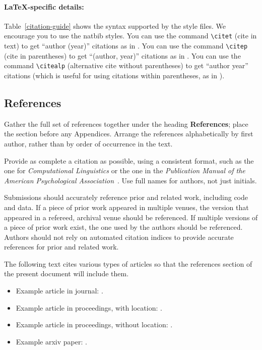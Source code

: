 \documentclass[11pt,a4paper]{article}
\begin{document}
\paragraph{\LaTeX-specific details:}
Table~\ref{citation-guide} shows the syntax supported by the style files.
We encourage you to use the natbib styles.
You can use the command {\small\verb|\citet|} (cite in text) to get ``author (year)'' citations as in \citet{Gusfield:97}.
You can use the command {\small\verb|\citep|} (cite in parentheses) to get ``(author, year)'' citations as in \citep{Gusfield:97}.
You can use the command {\small\verb|\citealp|} (alternative cite without  parentheses) to get ``author year'' citations (which is useful for  using citations within parentheses, as in \citealp{Gusfield:97}).


\subsection{References}
Gather the full set of references together under the heading \textbf{References}; place the section before any Appendices. 
Arrange the references alphabetically by first author, rather than by order of occurrence in the text.

Provide as complete a citation as possible, using a consistent format, such as the one for \emph{Computational Linguistics\/} or the one in the  \emph{Publication Manual of the American 
Psychological Association\/}~\citep{APA:83}.
Use full names for authors, not just initials.

Submissions should accurately reference prior and related work, including code and data.
If a piece of prior work appeared in multiple venues, the version that appeared in a refereed, archival venue should be referenced.
If multiple versions of a piece of prior work exist, the one used by the authors should be referenced.
Authors should not rely on automated citation indices to provide accurate references for prior and related work.

The following text cites various types of articles so that the references section of the present document will include them.
\begin{itemize}
\item Example article in journal: \citep{Ando2005}.
\item Example article in proceedings, with location: \citep{borschinger-johnson-2011-particle}.
\item Example article in proceedings, without location: \citep{andrew2007scalable}.
\item Example arxiv paper: \citep{rasooli-tetrault-2015}. 
\end{itemize}
\end{document}
